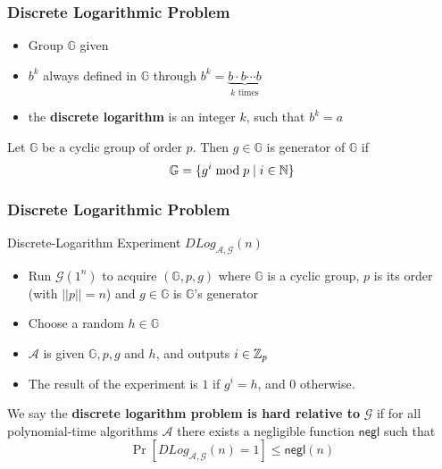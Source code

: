 \begin{frame}
	\frametitle{Discrete Logarithmic Problem}

	\begin{definition}
		\begin{itemize}
			\item Group $\mathbb{G}$ given
			\item $b^k$ always defined in $\mathbb{G}$ through $b^k = \underbrace{b\cdot b \cdots b}_{k\text{ times}}$
			\item the \textbf{discrete logarithm} is an integer $k$, such that $b^k = a$
		\end{itemize}
	\end{definition}
	\begin{definition}
		Let $\mathbb{G}$ be a cyclic group of order $p$. Then $g\in\mathbb{G}$ is generator of $\mathbb{G}$ if
			$$\mathbb{G} = \{g^i \bmod p \mid i \in \mathbb{N} \}$$
	\end{definition}
\end{frame}

\begin{frame}
	\frametitle{Discrete Logarithmic Problem}
	\begin{block}{Discrete-Logarithm Experiment $DLog_{\mathcal{A}, \mathcal{G}}(n)$} %
		\begin{itemize}
			\item Run $\mathcal{G}(1^n)$ to acquire $(\mathbb{G}, p, g)$ where $\mathbb{G}$ is a cyclic group, $p$ is its order (with $||p|| = n$) and $g\in \mathbb{G}$ is $\mathbb{G}$'s generator
			\item Choose a random $h\in\mathbb{G}$
			\item $\mathcal{A}$ is given $\mathbb{G}, p, g$ and $h$, and outputs $i\in \mathbb{Z}_p$
			\item The result of the experiment is $1$ if $g^i = h$, and $0$ otherwise.
		\end{itemize}
	\end{block}
	\begin{definition}
		We say the \textbf{discrete logarithm problem is hard relative to} $\mathcal{G}$ if for all polynomial-time algorithms $\mathcal{A}$ there exists a negligible function $\textsf{negl}$ such that 
			$$\Pr[DLog_{\mathcal{A}, \mathcal{G}}(n) = 1] \leq \textsf{negl}(n)$$
	\end{definition}
\end{frame}